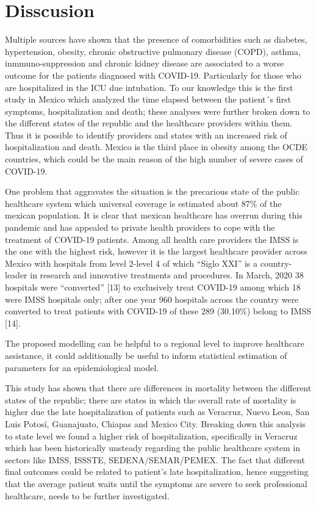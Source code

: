 \documentclass[10pt,letterpaper]{article}
\begin{document}
\hypertarget{disscusion}{%
\section{Disscusion}\label{disscusion}}

Multiple sources have shown that the presence of comorbidities such as
diabetes, hypertension, obesity, chronic obstructive pulmonary disease
(COPD), asthma, inmmuno-suppression and chronic kidney disease are
associated to a worse outcome for the patients diagnosed with COVID-19.
Particularly for those who are hospitalized in the ICU due intubation.
To our knowledge this is the first study in Mexico which analyzed the
time elapsed between the patient´s first symptoms, hospitalization and
death; these analyses were further broken down to the different states
of the republic and the healthcare providers within them. Thus it is
possible to identify providers and states with an increased risk of
hospitalization and death. Mexico is the third place in obesity among
the OCDE countries, which could be the main reason of the high number of
severe cases of COVID-19.

One problem that aggravates the situation is the precarious state of the
public healthcare system which universal coverage is estimated about
87\% of the mexican population. It is clear that mexican healthcare has
overrun during this pandemic and has appealed to private health
providers to cope with the treatment of COVID-19 patients. Among all
health care providers the IMSS is the one with the highest risk, however
it is the largest healthcare provider across Mexico with hospitals from
level 2-level 4 of which ``Siglo XXI'' is a country-leader in research
and innovative treatments and procedures. In March, 2020 38 hospitals
were ``converted'' {[}13{]} to exclusively treat COVID-19 among which 18
were IMSS hospitals only; after one year 960 hospitals across the
country were converted to treat patients with COVID-19 of these 289
(30.10\%) belong to IMSS {[}14{]}.

The proposed modelling can be helpful to a regional level to improve
healthcare assistance, it could additionally be useful to inform
statistical estimation of parameters for an epidemiological model.

This study has shown that there are differences in mortality between the
different states of the republic; there are states in which the overall
rate of mortality is higher due the late hospitalization of patients
such as Veracruz, Nuevo Leon, San Luis Potosí, Guanajuato, Chiapas and
Mexico City. Breaking down this analysis to state level we found a
higher risk of hospitalization, specifically in Veracruz which has been
historically unsteady regarding the public healthcare system in sectors
like IMSS, ISSSTE, SEDENA/SEMAR/PEMEX. The fact that different final
outcomes could be related to patient's late hospitalization, hence
suggesting that the average patient waits until the symptoms are severe
to seek professional healthcare, needs to be further investigated.
\end{document}

